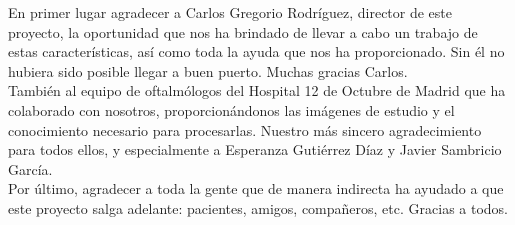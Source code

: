 En primer lugar agradecer a Carlos Gregorio Rodríguez,
director de este proyecto, la oportunidad que nos ha
brindado de llevar a cabo un trabajo de estas características,
así como toda la ayuda que nos ha proporcionado. Sin él
no hubiera sido posible llegar a buen puerto. Muchas gracias Carlos.\\

También al equipo de oftalmólogos del Hospital 12 de Octubre
de Madrid que ha colaborado con nosotros, proporcionándonos
las imágenes de estudio y el conocimiento necesario para
procesarlas. Nuestro más sincero agradecimiento para todos ellos,
y especialmente a Esperanza Gutiérrez Díaz y Javier Sambricio García. \\

Por último, agradecer a toda la gente que de manera indirecta
ha ayudado a que este proyecto salga adelante: pacientes,
amigos, compañeros, etc. Gracias a todos.